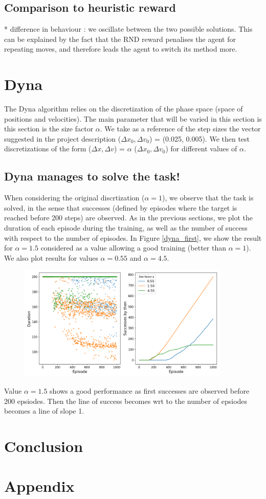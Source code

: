 \documentclass[a4paper, 12pt,oneside]{article}
\begin{document}
        \subsection{Comparison to heuristic reward}
        * difference in behaviour : we oscillate between the two possible solutions. This can be explained by the fact that the RND reward penalises the agent for repeating moves, and therefore leads the agent to switch its method more. 
    \section{Dyna}
        The Dyna algorithm relies on the discretization of the phase space (space of positions and velocities).
        The main parameter that will be varied in this section is this section is the size factor $\alpha$. We take as a reference of the step sizes the vector suggested in the project description ($\Delta x_0, \Delta v_0$) = (0.025, 0.005). We then test discretizations of the form ($\Delta x, \Delta v$) = $\alpha$ ($\Delta x_0, \Delta v_0$) 
        for different values of $\alpha$.

        \subsection{Dyna manages to solve the task!}
        When considering the original discrtization ($\alpha=1$), we observe that the task is solved, in the sense that successes (defined by episodes where the target is reached before 200 steps) are observed. 
        As in the previous sections, we plot the duration of each episode during the training, as well as the number of success with respect to the number of episodes. 
        In Figure \ref{dyna_first}, we show the result for $\alpha=1.5$ considered as a value allowing a good training (better than $\alpha=1$). We also plot results for values $\alpha=0.55$ and $\alpha=4.5$. 
        
        \begin{figure}[h]
            \centering
            \includegraphics[width=0.9\textwidth]{../runs/dyna/dyna_comparison.png}
            \caption{}
            \label{dyna-first}
        \end{figure}
        
        Value $\alpha=1.5$ shows a good performance as first successes are observed before 200 epsiodes. Then the line of success becomes wrt to the number of epsiodes becomes a line of slope 1. 


        \section{Conclusion}

        \section{Appendix}
\end{document}
